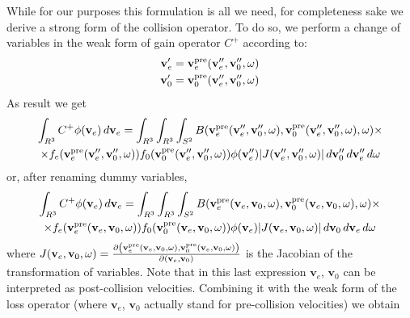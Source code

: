 \documentclass{article}
\newcommand{\diff}[1]{\, d#1}
\newcommand{\vect}[1]{\mathbf{#1}}
\newcommand{\of}[1]{\mleft( #1 \mright)}
\begin{document}
While for our purposes this formulation is all we need, for completeness sake we derive a strong form of the collision operator. To do so, we perform a change of variables in the weak form of gain operator $C^+$ according to:
\begin{align*}
\vect{v}_e^\prime &= \vect{v}_e^\text{pre} \of{\vect{v}_e^{\prime\prime}, \vect{v}_0^{\prime\prime}, \vect{\omega}}
\\
\vect{v}_0^\prime &= \vect{v}_0^\text{pre} \of{\vect{v}_e^{\prime\prime}, \vect{v}_0^{\prime\prime}, \vect{\omega}}
\end{align*}
As result we get
\begin{multline*}
\int_{R^3} C^+ \phi\of{\vect{v}_e} \diff{\vect{v}_e} 
= 
\int_{R^3} \int_{R^3} \int_{S^2} 
B\of{\vect{v}_e^\text{pre} \of{\vect{v}_e^{\prime\prime}, \vect{v}_0^{\prime\prime}, \vect{\omega}}, \vect{v}_0^\text{pre} \of{\vect{v}_e^{\prime\prime}, \vect{v}_0^{\prime\prime}, \vect{\omega}}, \vect{\omega}} 
\times
\\
\times
f_e\of{\vect{v}_e^\text{pre} \of{\vect{v}_e^{\prime\prime}, \vect{v}_0^{\prime\prime}, \vect{\omega}}} 
f_0\of{\vect{v}_0^\text{pre} \of{\vect{v}_e^{\prime\prime}, \vect{v}_0^{\prime\prime}, \vect{\omega}}} 
\phi\of{\vect{v}_e^{\prime\prime}} 
|J\of{\vect{v}_e^{\prime\prime}, \vect{v}_0^{\prime\prime}, \vect{\omega}}|
\diff{\vect{v}_0^{\prime\prime}} \diff{\vect{v}_e^{\prime\prime}} \diff{\vect{\omega}}
\end{multline*}
or, after renaming dummy variables,
\begin{multline*}
\int_{R^3} C^+ \phi\of{\vect{v}_e} \diff{\vect{v}_e} 
= 
\int_{R^3} \int_{R^3} \int_{S^2} 
B\of{\vect{v}_e^\text{pre} \of{\vect{v}_e, \vect{v}_0, \vect{\omega}}, \vect{v}_0^\text{pre} \of{\vect{v}_e, \vect{v}_0, \vect{\omega}}, \vect{\omega}} 
\times
\\
\times
f_e\of{\vect{v}_e^\text{pre} \of{\vect{v}_e, \vect{v}_0, \vect{\omega}}} 
f_0\of{\vect{v}_0^\text{pre} \of{\vect{v}_e, \vect{v}_0, \vect{\omega}}} 
\phi\of{\vect{v}_e} 
|J\of{\vect{v}_e, \vect{v}_0, \vect{\omega}}|
\diff{\vect{v}_0} \diff{\vect{v}_e} \diff{\vect{\omega}}
\end{multline*}
where $J\of{\vect{v}_e, \vect{v}_0, \vect{\omega}} = \frac{ \partial \left( \vect{v}_e^\text{pre}\of{\vect{v}_e, \vect{v}_0, \vect{\omega}}, \vect{v}_0^\text{pre}\of{\vect{v}_e, \vect{v}_0, \vect{\omega}} \right)}{\partial \left( \vect{v}_e, \vect{v}_0 \right)}$ is the Jacobian of the transformation of variables. Note that in this last expression $\vect{v}_e$, $\vect{v}_0$ can be interpreted as post-collision velocities. Combining it with the weak form of the loss operator (where $\vect{v}_e$, $\vect{v}_0$ actually stand for pre-collision velocities) we obtain
\end{document}
